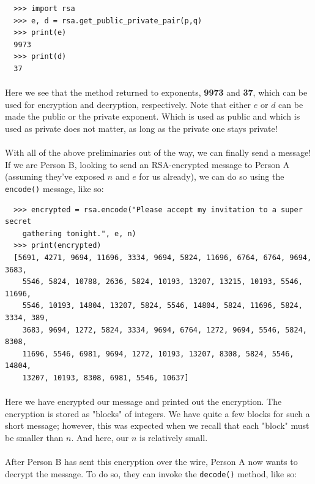 \documentclass[12pt,a4paper]{article}
\begin{document}
\begin{verbatim}
  >>> import rsa
  >>> e, d = rsa.get_public_private_pair(p,q)
  >>> print(e)
  9973
  >>> print(d)
  37
\end{verbatim}

\paragraph{}
Here we see that the method returned to exponents, \textbf{9973} and 
\textbf{37}, which can be used for encryption and decryption, 
respectively.  Note that either $e$ or $d$ can be made the public or the 
private exponent.  Which is used as public and which is used as private does 
not matter, as long as the private one stays private!

\paragraph{}
With all of the above preliminaries out of the way, we can finally send a 
message!  If we are Person B, looking to send an RSA-encrypted message to 
Person A (assuming they've exposed $n$ and $e$ for us already), we can do so 
using the \verb|encode()| message, like so:

\begin{verbatim}
  >>> encrypted = rsa.encode("Please accept my invitation to a super secret 
    gathering tonight.", e, n)
  >>> print(encrypted)
  [5691, 4271, 9694, 11696, 3334, 9694, 5824, 11696, 6764, 6764, 9694, 3683, 
    5546, 5824, 10788, 2636, 5824, 10193, 13207, 13215, 10193, 5546, 11696, 
    5546, 10193, 14804, 13207, 5824, 5546, 14804, 5824, 11696, 5824, 3334, 389, 
    3683, 9694, 1272, 5824, 3334, 9694, 6764, 1272, 9694, 5546, 5824, 8308, 
    11696, 5546, 6981, 9694, 1272, 10193, 13207, 8308, 5824, 5546, 14804, 
    13207, 10193, 8308, 6981, 5546, 10637]
\end{verbatim}

\paragraph{}
Here we have encrypted our message and printed out the encryption.  The 
encryption is stored as "blocks" of integers.  We have quite a few blocks for 
such a short message; however, this was expected when we recall that each 
"block" must be smaller than $n$.  And here, our $n$ is relatively small.

\paragraph{}
After Person B has sent this encryption over the wire, Person A now wants to 
decrypt the message.  To do so, they can invoke the \verb|decode()| method, 
like so:
\end{document}
